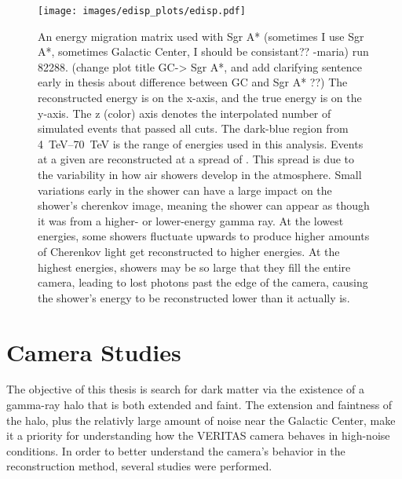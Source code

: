 {    \begin{figure}[!th]
      \centering
      \texttt{[image: images/edisp\_plots/edisp.pdf]}
      \caption[Energy Migration Matrix]{
        An energy migration matrix used with {\color{red}Sgr A* (sometimes I use Sgr A*, sometimes Galactic Center, I should be consistant?? -maria)} run 82288.
        {\color{red}(change plot title GC-> Sgr A*, and add clarifying sentence early in thesis about difference between GC and Sgr A* ??)}
        The reconstructed energy is on the x-axis, and the true energy is on the y-axis.
        The z (color) axis denotes the interpolated number of simulated events that passed all cuts.
        The dark-blue region from \SIrange{4}{70}{TeV} \EReco{} is the range of energies used in this analysis.
        Events at a given \ETrue{} are reconstructed at a spread of \EReco{}.
        This spread is due to the variability in how air showers develop in the atmosphere.
        Small variations early in the shower can have a large impact on the shower's cherenkov image, meaning the shower can appear as though it was from a higher- or lower-energy gamma ray.
        At the lowest \ETrue{} energies, some showers fluctuate upwards to produce higher amounts of Cherenkov light get reconstructed to higher \EReco{} energies.
        At the highest \ETrue{} energies, showers may be so large that they fill the entire camera, leading to lost photons past the edge of the camera, causing the shower's energy to be reconstructed lower than it actually is.
      }
      \label{fig:migmatrix}
    \end{figure}
  
  \FloatBarrier

\section{Camera Studies}
  The objective of this thesis is search for dark matter via the existence of a gamma-ray halo that is both extended and faint.
  The extension and faintness of the halo, plus the relativly large amount of noise near the Galactic Center, make it a priority for understanding how the VERITAS camera behaves in high-noise conditions.
  In order to better understand the camera's behavior in the reconstruction method, several studies were performed.

}
